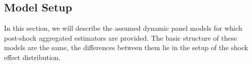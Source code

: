 \documentclass[11pt]{article}
\theoremstyle{definition}
\begin{document}



\subsection{Model Setup}

\label{modelsetup}

In this section, we will describe the assumed dynamic panel models for which 
post-shock aggregated estimators are provided. The basic structure of these models 
are the same, the differences between them lie in the setup of the shock effect 
distribution.
\end{document}
